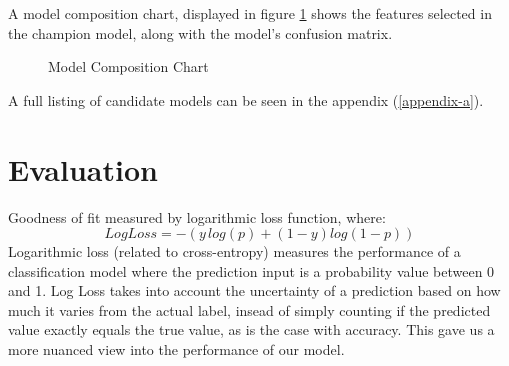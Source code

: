\vskip 1cm

A model composition chart, displayed in figure \ref{fig:model5features} shows the features selected in the champion model, along with the model's confusion matrix.
\vskip 1cm
    \begin{figure}
    \caption{\label{fig:model5features} Model Composition Chart}
\end{figure}
\cite{cm}
\vskip 1cm
A full listing of candidate models can be seen in the appendix (\ref{appendix-a}).

\section{Evaluation}
\vskip 1cm
Goodness of fit measured by logarithmic loss function, where: $$ Log Loss = -(y\,log(p) + (1 - y)log(1 - p)) $$
\vskip 1cm
\indent Logarithmic loss (related to cross-entropy) measures the performance of a classification model where the prediction input is a probability value between 0 and 1. Log Loss takes into account the uncertainty of a prediction based on how much it varies from the actual label, insead of simply counting if the predicted value exactly equals the true value, as is the case with accuracy. This gave us a more nuanced view into the performance of our model.